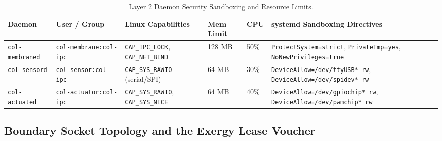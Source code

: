 \begin{table}[htbp]
\centering
\small
\setlength{\tabcolsep}{2.5pt}
\begin{tabular}{|p{}|p{}|p{}|p{}|p{}|p{}|}
\hline
\textbf{Daemon} & \textbf{User / Group} & \textbf{Linux Capabilities} & \textbf{Mem Limit} & \textbf{CPU} & \textbf{systemd Sandboxing Directives} \\
\hline
\texttt{col-\allowbreak membraned} & \texttt{col-membrane:\allowbreak col-ipc} & \texttt{CAP\_\allowbreak IPC\_\allowbreak LOCK}, \texttt{CAP\_\allowbreak NET\_\allowbreak BIND} & 128 MB & 50\% & \texttt{ProtectSystem=strict}, \texttt{PrivateTmp=yes}, \texttt{NoNewPrivileges=true} \\
\hline
\texttt{col-\allowbreak sensord} & \texttt{col-sensor:\allowbreak col-ipc} & \texttt{CAP\_\allowbreak SYS\_\allowbreak RAWIO} (serial/SPI) & 64 MB & 30\% & \texttt{DeviceAllow=\allowbreak/dev/ttyUSB* rw}, \texttt{DeviceAllow=\allowbreak/dev/spidev* rw} \\
\hline
\texttt{col-\allowbreak actuated} & \texttt{col-actuator:\allowbreak col-ipc} & \texttt{CAP\_\allowbreak SYS\_\allowbreak RAWIO}, \texttt{CAP\_\allowbreak SYS\_\allowbreak NICE} & 64 MB & 40\% & \texttt{DeviceAllow=\allowbreak/dev/gpiochip* rw}, \texttt{DeviceAllow=\allowbreak/dev/pwmchip* rw} \\
\hline
\end{tabular}
\caption{Layer 2 Daemon Security Sandboxing and Resource Limits.}
\label{tab:l2_daemon_sandboxing}
\end{table}

\subsection{Boundary Socket Topology and the Exergy Lease Voucher}

